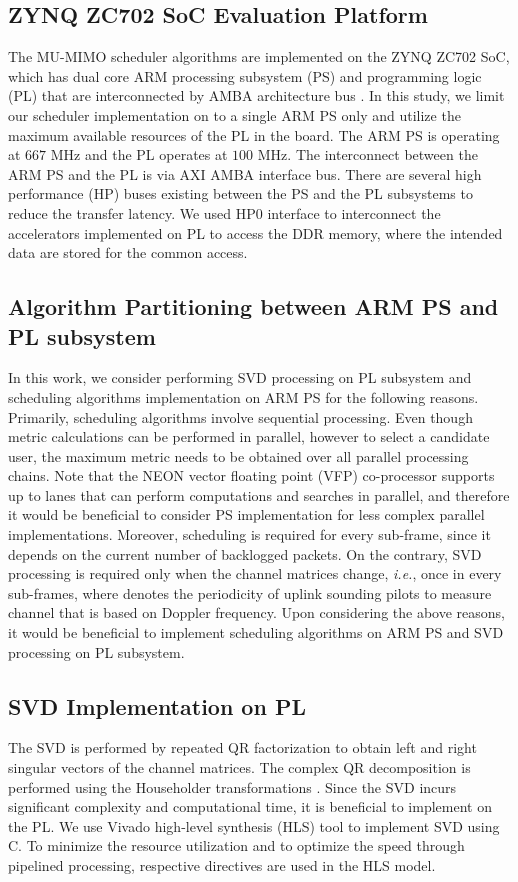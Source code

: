 \documentclass[conference,letterpaper,10pt]{./../../IEEE/IEEEtran}
\begin{document}
\subsection{ZYNQ ZC702 SoC Evaluation Platform}
The MU-MIMO scheduler algorithms are implemented on the ZYNQ ZC702 SoC, which has dual core ARM processing subsystem (PS) and programming logic (PL) that are interconnected by \ac{AMBA} architecture bus \cite{zynq}. In this study, we limit our scheduler implementation on to a single ARM PS only and utilize the maximum available resources of the PL in the board. The ARM PS is operating at $667$ MHz and the PL operates at $100$ MHz. The interconnect between the ARM PS and the PL is via \ac{AXI} \ac{AMBA} interface bus. There are several high performance (HP) buses existing between the PS and the PL subsystems to reduce the transfer latency. We used HP$0$ interface to interconnect the accelerators implemented on PL to access the DDR memory, where the intended data are stored for the common access.

\subsection{Algorithm Partitioning between ARM PS and PL subsystem}
In this work, we consider performing SVD processing on PL subsystem and scheduling algorithms implementation on ARM PS for the following reasons. Primarily, scheduling algorithms involve sequential processing. Even though metric calculations can be performed in parallel, however to select a candidate user, the maximum metric needs to be obtained over all parallel processing chains. Note that the NEON vector floating point (VFP) co-processor supports up to  lanes that can perform  computations and searches in parallel, and therefore it would be beneficial to consider PS implementation for less complex parallel implementations. Moreover, scheduling is required for every sub-frame, since it depends on the current number of backlogged packets. On the contrary, SVD processing is required only when the channel matrices change, \textit{i.e.}, once in every  sub-frames, where  denotes the periodicity of uplink sounding pilots to measure channel that is based on Doppler frequency. Upon considering the above reasons, it would be beneficial to implement scheduling algorithms on ARM PS and SVD processing on PL subsystem.

\subsection{SVD Implementation on PL}
The SVD is performed by repeated QR factorization to obtain left and right singular vectors of the channel matrices. The complex QR decomposition is performed using the Householder transformations \cite{aft}. Since the SVD incurs significant complexity and computational time, it is beneficial to implement on the PL. We use Vivado high-level synthesis (HLS) tool to implement SVD using C. To minimize the resource utilization and to optimize the speed through pipelined processing, respective directives are used in the HLS model.
\end{document}
